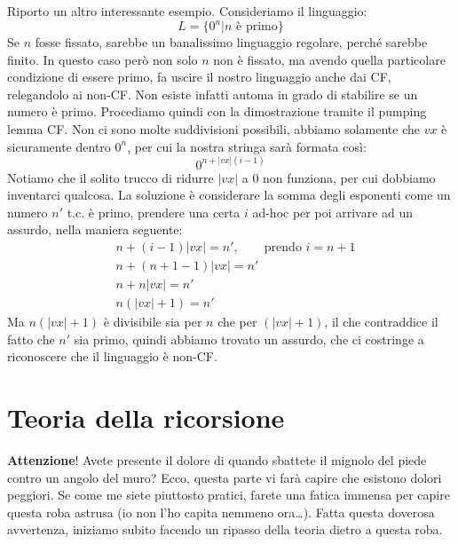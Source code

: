 \documentclass[a4paper,oneside]{scrbook}
\begin{document}
Riporto un altro interessante esempio. Consideriamo il linguaggio:
\begin{equation*}
    L=\{0^n|n \text{ è primo}\}
\end{equation*}
Se $n$ fosse fissato, sarebbe un banalissimo linguaggio regolare, perché sarebbe finito. In questo caso però non solo $n$ non è fissato, ma avendo
quella particolare condizione di essere primo, fa uscire il nostro linguaggio anche dai CF, relegandolo ai non-CF. Non esiste infatti automa in grado
di stabilire se un numero è primo. Procediamo quindi con la dimostrazione tramite il pumping lemma CF.
Non ci sono molte suddivisioni possibili, abbiamo solamente che $vx$ è sicuramente dentro $0^n$, per cui la nostra stringa sarà formata così:
$$0^{n+|vx|(i-1)}$$
Notiamo che il solito trucco di ridurre $|vx|$ a $0$ non funziona, per cui dobbiamo inventarci qualcosa.
La soluzione è considerare la somma degli esponenti come un numero $n'$ t.c. è primo, prendere una certa $i$ ad-hoc per poi arrivare ad un assurdo, nella maniera seguente:
\begin{align*}
    &n+(i-1)|vx|=n', \qquad \text{prendo } i=n+1\\
    &n+(n+1-1)|vx|=n'\\
    &n+n|vx|=n'\\
    &n(|vx|+1)=n'
\end{align*}
Ma $n(|vx|+1)$ è divisibile sia per $n$ che per $(|vx|+1)$, il che contraddice il fatto che $n'$ sia primo, quindi abbiamo trovato un assurdo, che ci costringe
a riconoscere che il linguaggio è non-CF.

\chapter{Teoria della ricorsione}
\textbf{Attenzione}! Avete presente il dolore di quando sbattete il mignolo del piede contro un angolo del muro?
Ecco, questa parte vi farà capire che esistono dolori peggiori. Se come me siete piuttosto pratici, farete una fatica
immensa per capire questa roba astrusa (io non l'ho capita nemmeno ora\dots).
Fatta questa doverosa avvertenza, iniziamo subito facendo un ripasso della teoria dietro a questa roba.
\end{document}
